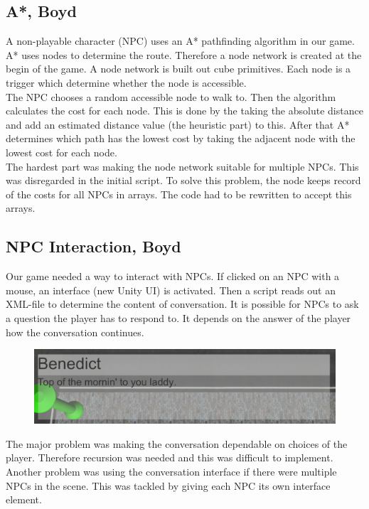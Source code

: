 \documentclass{article}
\begin{document}
\subsection{A*, Boyd}
A  non-playable character (NPC) uses an A* pathfinding algorithm in our game. A* uses nodes to determine the route. Therefore a node network is created at the begin of the game. A node network is built out cube primitives. Each node is a trigger which determine whether the node is accessible. \\
The NPC chooses a random accessible node to walk to. Then the algorithm calculates the cost for each node. This is done by the taking the absolute distance and add an estimated distance value (the heuristic part) to this. After that A* determines which path has the lowest cost by taking the adjacent node with the lowest cost for each node.\\
The hardest part was making the node network  suitable for multiple NPCs. This was disregarded in the initial script. To solve this problem, the node keeps record of the costs for all NPCs in arrays.  The code had to be rewritten to accept this arrays.

\subsection{NPC Interaction, Boyd}
Our game needed a way to interact with NPCs. If clicked on an NPC with a mouse, an interface (new Unity UI) is activated. Then a script reads out an XML-file to determine the content of conversation. It is possible for NPCs to ask a question the player has to respond to. It depends on the answer of the player how the conversation continues. \\

	\begin{figure}[ht!]
		\centering
		\includegraphics[width=120mm]{images/Conversation.png}
	\end{figure}

The major problem was making the conversation dependable on choices of the player. Therefore recursion was needed and this was difficult to implement. \\
Another problem was using the conversation interface if there were multiple NPCs in the scene. This was tackled by giving each NPC its own interface element. 
\end{document}
